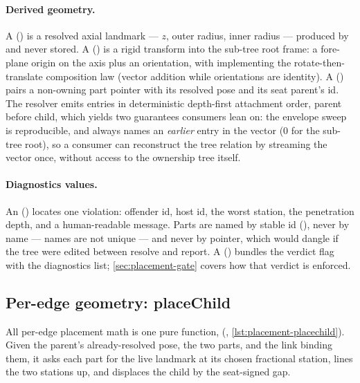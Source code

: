 \paragraph{Derived geometry.}
A  () is a resolved axial landmark --- $z$,
outer radius, inner radius --- produced by  and never stored. A 
() is a rigid transform into the sub-tree root frame: a
fore-plane origin on the axis plus an orientation, with  implementing the
rotate-then-translate composition law (vector addition while orientations are identity). A
 () pairs a non-owning part pointer with its
resolved pose and its seat parent's id. The resolver emits  entries in deterministic
depth-first attachment order, parent before child, which yields two guarantees consumers lean on:
the envelope sweep is reproducible, and  always names an \emph{earlier} entry in the
vector (0 for the sub-tree root), so a consumer can reconstruct the tree relation by streaming the
vector once, without access to the ownership tree itself.

\paragraph{Diagnostics values.}
An  () locates one violation:
offender id, host id, the worst station, the penetration depth, and a human-readable message. Parts
are named by stable id (), never by name --- names are not unique --- and never
by pointer, which would dangle if the tree were edited between resolve and report. A
 () bundles the verdict flag with the
diagnostics list; \cref{sec:placement-gate} covers how that verdict is enforced.

\subsection{Per-edge geometry: placeChild}\label{sec:placement-placechild}

All per-edge placement math is one pure function, 
(, \cref{lst:placement-placechild}). Given the parent's
already-resolved pose, the two parts, and the link binding them, it asks each part for the live
landmark at its chosen fractional station, lines the two stations up, and displaces the child by
the seat-signed gap.

